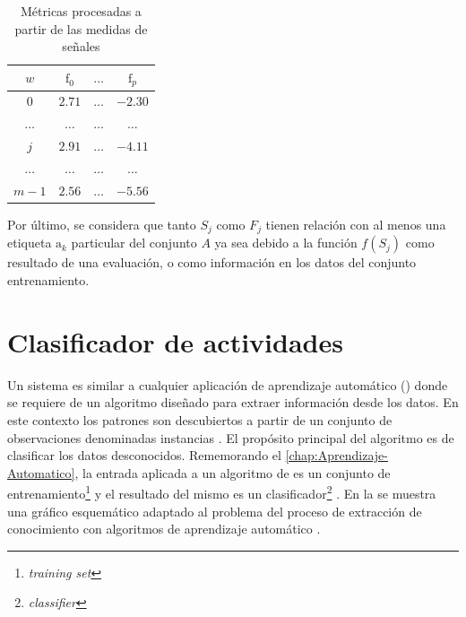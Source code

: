\begin{table}[!tbph]
\begin{centering}
\begin{tabular}{|c|c|c|c|}
\hline 
$w$ & $\mathrm{f}_{0}$ & $\ldots$ & $\mathrm{f}_{p}$\tabularnewline
\hline 
\hline 
$0$ & $2.71$ & \texttt{$\ldots$} & \texttt{$-2.30$}\tabularnewline
\hline 
$\ldots$ & $\ldots$ & \texttt{$\ldots$} & \texttt{$\ldots$}\tabularnewline
\hline 
$j$ & $2.91$ & \texttt{$\ldots$} & \texttt{$-4.11$}\tabularnewline
\hline 
$\ldots$ & $\ldots$ & \texttt{$\ldots$} & \texttt{$\ldots$}\tabularnewline
\hline 
$m-1$ & $2.56$ & \texttt{$\ldots$} & \texttt{$-5.56$}\tabularnewline
\hline 
\end{tabular}
\par\end{centering}
\caption[Métricas de proceso de extracción]{\label{tab4:features}Métricas procesadas a partir de las medidas
de señales}
\end{table}

Por último, se considera que tanto $S_{j}$ como $F_{j\ensuremath{}}$
tienen relación con al menos una etiqueta $\mathrm{a}_{k}$ particular
del conjunto $A$ ya sea debido a la función $f(S_{j})$ como resultado
de una evaluación, o como información en los datos del conjunto entrenamiento.

\section{Clasificador de actividades }

\label{sec45:clasificador}Un sistema  es similar a cualquier
aplicación de aprendizaje automático () donde se requiere
de un algoritmo diseñado para extraer información desde los datos.
En este contexto los patrones son descubiertos a partir de un conjunto
de observaciones denominadas instancias \cite{LaraLabrador2013}.
El propósito principal del algoritmo es de clasificar los datos desconocidos.
Rememorando el \ref{chap:Aprendizaje-Automatico}, la entrada aplicada
a un algoritmo de  es un conjunto de entrenamiento\footnote{\emph{training set}}
y el resultado del mismo es un clasificador\footnote{\emph{classifier}}
\cite{Rajaraman2011}. En la  se muestra
una gráfico esquemático adaptado al problema  del proceso
de extracción de conocimiento con algoritmos de aprendizaje automático
\cite{Raschka2014}.

